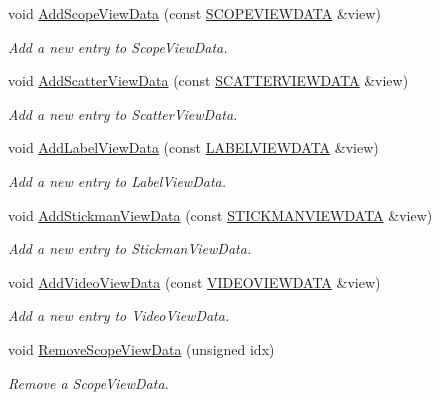 \begin{CompactItemize}
void \hyperlink{class_main_window_cfd558a4ee1c1753d55100fe1fa7a0ab}{AddScopeViewData} (const \hyperlink{class_s_c_o_p_e_v_i_e_w_d_a_t_a}{SCOPEVIEWDATA} \&view)
\begin{CompactList}\small\item\em Add a new entry to ScopeViewData. \item\end{CompactList}\item 
void \hyperlink{class_main_window_b3202816e13839cd511ca279dd6f6074}{AddScatterViewData} (const \hyperlink{class_s_c_a_t_t_e_r_v_i_e_w_d_a_t_a}{SCATTERVIEWDATA} \&view)
\begin{CompactList}\small\item\em Add a new entry to ScatterViewData. \item\end{CompactList}\item 
void \hyperlink{class_main_window_f8767e75b767be1e6d95491efbc75678}{AddLabelViewData} (const \hyperlink{class_l_a_b_e_l_v_i_e_w_d_a_t_a}{LABELVIEWDATA} \&view)
\begin{CompactList}\small\item\em Add a new entry to LabelViewData. \item\end{CompactList}\item 
void \hyperlink{class_main_window_52513bcfdf540f40b8b739bc7ac5110e}{AddStickmanViewData} (const \hyperlink{class_s_t_i_c_k_m_a_n_v_i_e_w_d_a_t_a}{STICKMANVIEWDATA} \&view)
\begin{CompactList}\small\item\em Add a new entry to StickmanViewData. \item\end{CompactList}\item 
void \hyperlink{class_main_window_3b6665baf224885d9ed51f66aed413d4}{AddVideoViewData} (const \hyperlink{class_v_i_d_e_o_v_i_e_w_d_a_t_a}{VIDEOVIEWDATA} \&view)
\begin{CompactList}\small\item\em Add a new entry to VideoViewData. \item\end{CompactList}\item 
void \hyperlink{class_main_window_8568ff0e98fd287a2e5b92fd63072e7a}{RemoveScopeViewData} (unsigned idx)
\begin{CompactList}\small\item\em Remove a ScopeViewData. \item\end{CompactList}\item 

\end{CompactItemize}
